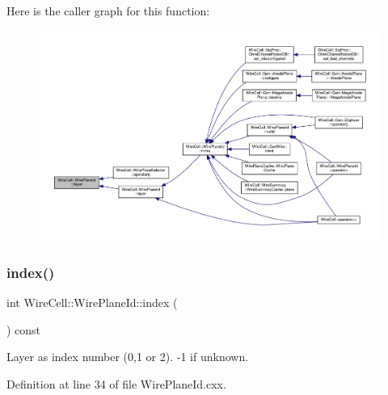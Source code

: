 Here is the caller graph for this function\+:
\nopagebreak
\begin{figure}[H]
\begin{center}
\leavevmode
\includegraphics[width=350pt]{class_wire_cell_1_1_wire_plane_id_a33a565cfc76f84e9bc103b1ca33d0974_icgraph}
\end{center}
\end{figure}
\mbox{\label{class_wire_cell_1_1_wire_plane_id_a72e32df6a0f0721dba0f1c5c76649c9a}} 
\subsubsection{\texorpdfstring{index()}{index()}}
{\footnotesize\ttfamily int Wire\+Cell\+::\+Wire\+Plane\+Id\+::index (\begin{DoxyParamCaption}{ }\end{DoxyParamCaption}) const}



Layer as index number (0,1 or 2). -\/1 if unknown. 



Definition at line 34 of file Wire\+Plane\+Id.\+cxx.


